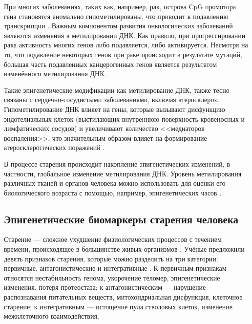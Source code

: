 При многих заболеваниях, таких как, например, рак, острова CpG промотора гена становятся аномально гипометилированы, что приводит к подавлению транскрипции \autocite{Wang2018Cancer}. Важным компонентом развития онкологических заболеваний являются изменения в метилировании ДНК. Как правило, при прогрессировании рака активность многих генов либо подавляется, либо активируется. Несмотря на то, что подавление некоторых генов при раке происходит в результате мутаций, большая часть подавленных канцерогенных генов является результатом изменённого метилирования ДНК. 

Такие эпигенетические модификации как метилирование ДНК, также тесно связаны с сердечно-сосудистыми заболеваниями, включая атеросклероз. Гипометилирование ДНК влияет на гены, которые вызывают дисфункцию эндотелиальных клеток (выстилающих внутреннюю поверхность кровеносных и лимфатических сосудов) и увеличивают количество <<медиаторов воспаления>>, что значительным образом влияет на формирование атеросклеротических поражений \autocite{Castro2003}. 

В процессе старения происходит накопление эпигенетических изменений, в частности, глобальное изменение метилирования ДНК. Уровень метилирования различных тканей и органов человека можно использовать для оценки его биологического возраста с помощью, например, эпигенетических часов \autocite{Horvath2013}. 

\subsection{Эпигенетические биомаркеры старения человека}\label{subsec:ch1/sec1/subsec3}

Старение --- сложное ухудшение физиологических процессов с течением времени, происходящее в большинстве живых организмов \autocite{rose1994evolutionary}. Учёные предложили девять признаков старения, которые можно разделить на три категории: первичные, антагонистические и интегративные \autocite{LopezOtin2013}. К первичным признакам относятся нестабильность генома, укорочение теломер, эпигенетические изменения, потеря протеостаза; к антагонистическим --- нарушение распознавания питательных веществ, митохондриальная дисфункция, клеточное старение; к интегративным --- истощение пула стволовых клеток, изменение межклеточного взаимодействия. 

